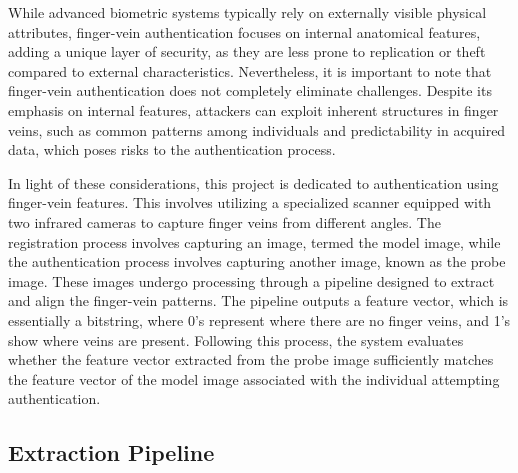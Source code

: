 While advanced biometric systems typically rely on externally visible physical attributes, finger-vein authentication focuses on internal anatomical features, adding a unique layer of security, as they are less prone to replication or theft compared to external characteristics. Nevertheless, it is important to note that finger-vein authentication does not completely eliminate challenges. Despite its emphasis on internal features, attackers can exploit inherent structures in finger veins, such as common patterns among individuals and predictability in acquired data, which poses risks to the authentication process.


In light of these considerations, this project is dedicated to authentication using finger-vein features.
This involves utilizing a specialized scanner equipped with two infrared cameras to capture finger veins from different angles.
The registration process involves capturing an image, termed the model image, while the authentication process involves capturing another image, known as the probe image. These images undergo processing through a pipeline designed to extract and align the finger-vein patterns.
The pipeline outputs a feature vector, which is essentially a bitstring, where 0's represent where there are no finger veins, and 1's show where veins are present.
Following this process, the system evaluates whether the feature vector extracted from the probe image sufficiently matches the feature vector of the model image associated with the individual attempting authentication.



\subsection{Extraction Pipeline}\label{sec:extraction-pipeline}

